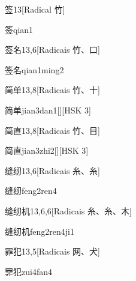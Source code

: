 \begin{entry}{签}{13}[Radical ⽵]
  \begin{phonetics}{签}{qian1}
  \end{phonetics}
\end{entry}

\begin{entry}{签名}{13,6}[Radicais ⽵、⼝]
  \begin{phonetics}{签名}{qian1ming2}
  \end{phonetics}
\end{entry}

\begin{entry}{简单}{13,8}[Radicais ⽵、⼗]
  \begin{phonetics}{简单}{jian3dan1}[][HSK 3]
  \end{phonetics}
\end{entry}

\begin{entry}{简直}{13,8}[Radicais ⽵、⽬]
  \begin{phonetics}{简直}{jian3zhi2}[][HSK 3]
  \end{phonetics}
\end{entry}

\begin{entry}{缝纫}{13,6}[Radicais ⽷、⽷]
  \begin{phonetics}{缝纫}{feng2ren4}
  \end{phonetics}
\end{entry}

\begin{entry}{缝纫机}{13,6,6}[Radicais ⽷、⽷、⽊]
  \begin{phonetics}{缝纫机}{feng2ren4ji1}
  \end{phonetics}
\end{entry}

\begin{entry}{罪犯}{13,5}[Radicais ⽹、⽝]
  \begin{phonetics}{罪犯}{zui4fan4}
  \end{phonetics}
\end{entry}

